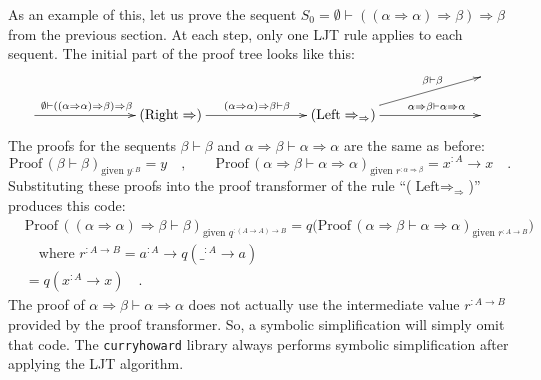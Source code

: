 As an example of this, let us prove the sequent $S_{0}=\emptyset\vdash((\alpha\Rightarrow\alpha)\Rightarrow\beta)\Rightarrow\beta$
from the previous section. At each step, only one LJT rule applies
to each sequent. The initial part of the proof tree looks like this:
\[
\xymatrix{\xyScaleY{1.5pc}\xyScaleX{6pc} &  &  & ~\\
\ar[r]\sp(0.4){\emptyset\vdash((\alpha\Rightarrow\alpha)\Rightarrow\beta)\Rightarrow\beta} & (\text{Right}\Rightarrow)\ar[r]\sp(0.5){(\alpha\Rightarrow\alpha)\Rightarrow\beta\vdash\beta} & (\text{Left}\Rightarrow_{\Rightarrow})\ar[ru]\sp(0.65){\beta\vdash\beta}\ar[r]\sp(0.65){\alpha\Rightarrow\beta\vdash\alpha\Rightarrow\alpha} & ~
}
\]
The proofs for the sequents $\beta\vdash\beta$ and $\alpha\Rightarrow\beta\vdash\alpha\Rightarrow\alpha$
are the same as before:
\[
\text{Proof}\,(\beta\vdash\beta)_{\text{given }y^{:B}}=y\quad,\quad\quad\text{Proof}\,(\alpha\Rightarrow\beta\vdash\alpha\Rightarrow\alpha)_{\text{given }r^{:\alpha\Rightarrow\beta}}=x^{:A}\rightarrow x\quad.
\]
Substituting these proofs into the proof transformer of the rule \textsf{``}($\text{Left}\Rightarrow_{\Rightarrow}$)\textsf{''}
produces this code:
\begin{align*}
 & \text{Proof}\,((\alpha\Rightarrow\alpha)\Rightarrow\beta\vdash\beta)_{\text{given }q^{:(A\rightarrow A)\rightarrow B}}=q\big(\text{Proof}\,(\alpha\Rightarrow\beta\vdash\alpha\Rightarrow\alpha)_{\text{given }r^{:A\rightarrow B}}\big)\\
 & \quad\text{where }r^{:A\rightarrow B}=a^{:A}\rightarrow q(\_^{:A}\rightarrow a)\\
 & =q(x^{:A}\rightarrow x)\quad.
\end{align*}
The proof of $\alpha\Rightarrow\beta\vdash\alpha\Rightarrow\alpha$
does not actually use the intermediate value $r^{:A\rightarrow B}$
provided by the proof transformer. So, a symbolic simplification will
simply omit that code. The \lstinline!curryhoward! library always
performs symbolic simplification after applying the LJT algorithm. 


